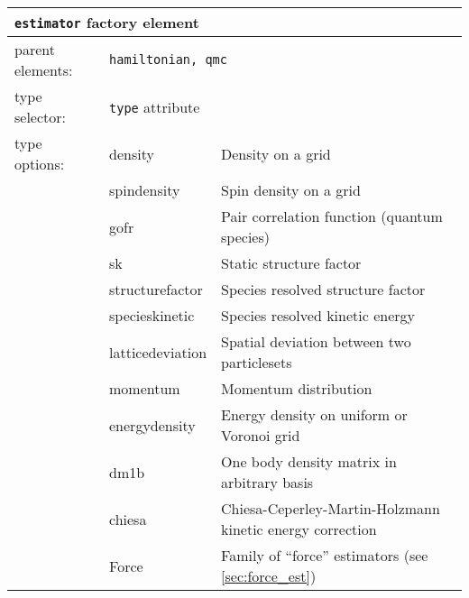 \FloatBarrier
\begin{table}[h]
\begin{center}
\begin{tabularx}{\textwidth}{l l l l l X }
\hline
\multicolumn{6}{l}{\texttt{estimator} factory element} \\
\hline
\multicolumn{2}{l}{parent elements:} & \multicolumn{4}{l}{\texttt{hamiltonian, qmc}}\\
\multicolumn{2}{l}{type   selector:} & \multicolumn{4}{l}{\texttt{type} attribute}\\
\multicolumn{2}{l}{type   options: } & \multicolumn{2}{l}{density           } & \multicolumn{2}{l}{Density on a grid}\\
\multicolumn{2}{l}{                } & \multicolumn{2}{l}{spindensity       } & \multicolumn{2}{l}{Spin density on a grid}\\
\multicolumn{2}{l}{                } & \multicolumn{2}{l}{gofr              } & \multicolumn{2}{l}{Pair correlation function (quantum species)}\\
\multicolumn{2}{l}{                } & \multicolumn{2}{l}{sk                } & \multicolumn{2}{l}{Static structure factor}\\
\multicolumn{2}{l}{                } & \multicolumn{2}{l}{structurefactor   } & \multicolumn{2}{l}{Species resolved structure factor}\\
\multicolumn{2}{l}{                } & \multicolumn{2}{l}{specieskinetic    } & \multicolumn{2}{l}{Species resolved kinetic energy}\\
\multicolumn{2}{l}{                } & \multicolumn{2}{l}{latticedeviation  } & \multicolumn{2}{l}{Spatial deviation between two particlesets}\\
\multicolumn{2}{l}{                } & \multicolumn{2}{l}{momentum          } & \multicolumn{2}{l}{Momentum distribution}\\
\multicolumn{2}{l}{                } & \multicolumn{2}{l}{energydensity     } & \multicolumn{2}{l}{Energy density on uniform or Voronoi grid}\\
\multicolumn{2}{l}{                } & \multicolumn{2}{l}{dm1b              } & \multicolumn{2}{l}{One body density matrix in arbitrary basis}\\
\multicolumn{2}{l}{                } & \multicolumn{2}{l}{chiesa            } & \multicolumn{2}{l}{Chiesa-Ceperley-Martin-Holzmann kinetic energy correction}\\
\multicolumn{2}{l}{                } & \multicolumn{2}{l}{Force             } & \multicolumn{2}{l}{Family of ``force'' estimators (see \ref{sec:force_est})}\\

\end{tabularx}
\end{center}
\end{table}
